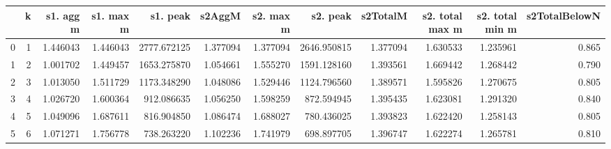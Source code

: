 \begin{tabular}{lrrrrrrrrrrr}
\toprule
{} &  k &  s1. agg m &  s1. max m &     s1. peak &    s2AggM &  s2. max m &     s2. peak &  s2TotalM &  s2. total max m &  s2. total min m &  s2TotalBelowN \\
\midrule
0 &  1 &   1.446043 &   1.446043 &  2777.672125 &  1.377094 &   1.377094 &  2646.950815 &  1.377094 &         1.630533 &         1.235961 &          0.865 \\
1 &  2 &   1.001702 &   1.449457 &  1653.275870 &  1.054661 &   1.555270 &  1591.128160 &  1.393561 &         1.669442 &         1.268442 &          0.790 \\
2 &  3 &   1.013050 &   1.511729 &  1173.348290 &  1.048086 &   1.529446 &  1124.796560 &  1.389571 &         1.595826 &         1.270675 &          0.805 \\
3 &  4 &   1.026720 &   1.600364 &   912.086635 &  1.056250 &   1.598259 &   872.594945 &  1.395435 &         1.623081 &         1.291320 &          0.840 \\
4 &  5 &   1.049096 &   1.687611 &   816.904850 &  1.086474 &   1.688027 &   780.436025 &  1.393823 &         1.622420 &         1.258143 &          0.805 \\
5 &  6 &   1.071271 &   1.756778 &   738.263220 &  1.102236 &   1.741979 &   698.897705 &  1.396747 &         1.622274 &         1.265781 &          0.810 \\
\bottomrule
\end{tabular}
